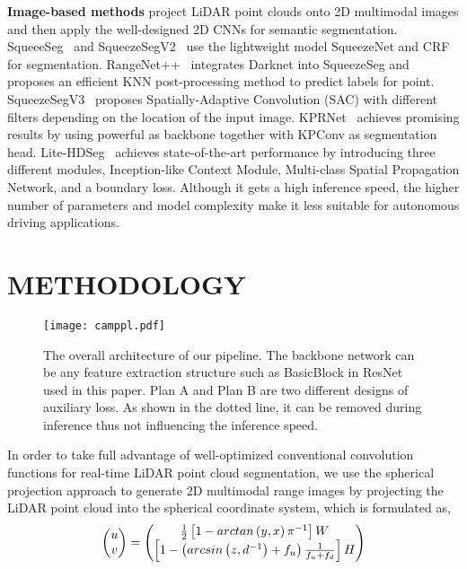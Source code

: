 \documentclass{article}
\begin{document}
\noindent\textbf{Image-based methods} project LiDAR point clouds onto 2D multimodal images and then apply the well-designed 2D CNNs for semantic segmentation. SqueeeSeg~\cite{wu2018squeezeseg} and SqueezeSegV2~\cite{wu2019squeezesegv2} use the lightweight model SqueezeNet and CRF for segmentation. RangeNet++~\cite{milioto2019rangenet++} integrates Darknet into SqueezeSeg and proposes an efficient KNN post-processing method to predict labels for point. SqueezeSegV3~\cite{xu2020squeezesegv3} proposes Spatially-Adaptive Convolution (SAC) with different filters depending on the location of the input image. KPRNet~\cite{kochanov2020kprnet} achieves promising results by using powerful as backbone together with KPConv as segmentation head. Lite-HDSeg~\cite{Lite-HDSeg} achieves state-of-the-art performance by introducing three different modules, Inception-like Context Module, Multi-class Spatial Propagation Network, and a boundary loss. Although it gets a high inference speed, the higher number of parameters and model complexity make it less suitable for autonomous driving applications. 


\section{METHODOLOGY}
\label{sec:method}
\begin{figure*}[t]
\centering
\texttt{[image: camppl.pdf]}
\vspace{-5mm}
\caption{The overall architecture of our pipeline. The backbone network can be any feature extraction structure such as BasicBlock in ResNet used in this paper. Plan A and Plan B are two different designs of auxiliary loss. As shown in the dotted line, it can be removed during inference thus not influencing the inference speed.}
\label{fig:framework}
\vspace{-6mm}
\end{figure*}

In order to take full advantage of well-optimized conventional convolution functions for real-time LiDAR point cloud segmentation, we use the spherical projection approach to generate 2D multimodal range images by projecting the LiDAR point cloud into the spherical coordinate system, which is formulated as, 
\vspace{-1.5ex}
\begin{equation}
\label{proj}
\left(
\begin{matrix}
	u \\
	v
\end{matrix}
\right) =
\left(
\begin{matrix}
	\frac{1}{2}\left [ 1-arctan\left ( y,x \right ) \pi^{-1} \right ]W \\
	\left [ 1 - \left (  arcsin\left ( z, d^{-1} \right ) + f_{u} \right )  \frac{1}{f_{u} + f_{d} }\right ]H
\end{matrix}
\right)
\vspace{-1.5ex}
\end{equation}
\end{document}
